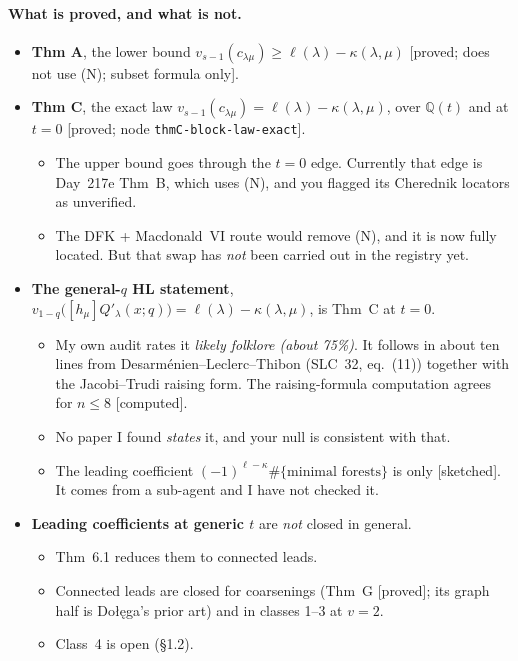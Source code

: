 \documentclass[10pt]{article}
\newcommand{\grade}[1]{\textsf{[#1]}}
\begin{document}
\paragraph{What is proved, and what is not.}
\begin{itemize}
\item \textbf{Thm A}, the lower bound $v_{s-1}(c_{\lambda\mu})\ge\ell(\lambda)-\kappa(\lambda,\mu)$
  \grade{proved; does not use (N); subset formula only}.
\item \textbf{Thm C}, the exact law $v_{s-1}(c_{\lambda\mu})=\ell(\lambda)-\kappa(\lambda,\mu)$, over $\mathbb{Q}(t)$ and
  at $t=0$ \grade{proved; node \texttt{thmC-block-law-exact}}.
  \begin{itemize}
  \item The upper bound goes through the $t=0$ edge. Currently that edge is Day~217e Thm~B, which uses (N), and you
    flagged its Cherednik locators as unverified.
  \item The DFK + Macdonald~VI route would remove (N), and it is now fully located. But that swap has \emph{not} been
    carried out in the registry yet.
  \end{itemize}
\item \textbf{The general-$q$ HL statement}, $v_{1-q}\big([h_\mu]Q'_\lambda(x;q)\big)=\ell(\lambda)-\kappa(\lambda,\mu)$,
  is Thm~C at $t=0$.
  \begin{itemize}
  \item My own audit rates it \emph{likely folklore (about 75\%)}. It follows in about ten lines from
    Desarm\'enien--Leclerc--Thibon (SLC~32, eq.~(11)) together with the Jacobi--Trudi raising form. The
    raising-formula computation agrees for $n\le8$ \grade{computed}.
  \item No paper I found \emph{states} it, and your null is consistent with that.
  \item The leading coefficient $(-1)^{\ell-\kappa}\#\{\text{minimal forests}\}$ is only \grade{sketched}. It comes from a
    sub-agent and I have not checked it.
  \end{itemize}
\item \textbf{Leading coefficients at generic $t$} are \emph{not} closed in general.
  \begin{itemize}
  \item Thm~6.1 reduces them to connected leads.
  \item Connected leads are closed for coarsenings (Thm~G \grade{proved}; its graph half is Do\l{}\k{e}ga's prior art) and
    in classes 1--3 at $v=2$.
  \item Class~4 is open (\S1.2).
  \end{itemize}
\end{itemize}
\end{document}
